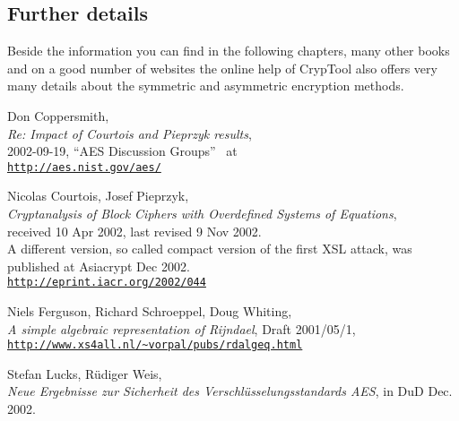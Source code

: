 \subsection{Further details}

Beside the information you can find in the following chapters, many other
books and on a good number of websites the online help of 
CrypTool also offers very many details about the 
symmetric and asymmetric encryption methods.


\newpage
\begin{thebibliography}{99999}

  
        Don Coppersmith, \\
        {\em Re: Impact of Courtois and Pieprzyk results}, \\
        2002-09-19, ``AES Discussion Groups''~ at \\
        \href{http://aes.nist.gov/aes/}
        {\texttt{http://aes.nist.gov/aes/}}

  
        Nicolas Courtois, Josef Pieprzyk, \\
        {\em Cryptanalysis of Block Ciphers with Overdefined Systems
             of Equations}, \\
        received 10 Apr 2002, last revised 9 Nov 2002.\\
        A different version, so called compact version of the first XSL attack,
        was published at Asiacrypt Dec 2002. \\
        \href{http://eprint.iacr.org/2002/044}
        {\texttt{http://eprint.iacr.org/2002/044}}

  
        Niels Ferguson, Richard Schroeppel, Doug Whiting, \\
        {\em A simple algebraic representation of Rijndael}, 
        Draft 2001/05/1, \\
        \href{http://www.xs4all.nl/~vorpal/pubs/rdalgeq.html}
        {\texttt{http://www.xs4all.nl/\~{}vorpal/pubs/rdalgeq.html}}

  
        Stefan Lucks, R\"udiger Weis, \\
        {\em Neue Ergebnisse zur Sicherheit des Verschl\"usselungsstandards
             AES}, 
        in DuD Dec. 2002.


\end{thebibliography}
